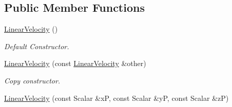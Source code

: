 \subsection*{Public Member Functions}
\begin{DoxyCompactItemize}
\item 
\hyperlink{classow__core_1_1LinearVelocity_af76f6ab631d054f1c09e791197508f7c}{Linear\+Velocity} ()\hypertarget{classow__core_1_1LinearVelocity_af76f6ab631d054f1c09e791197508f7c}{}\label{classow__core_1_1LinearVelocity_af76f6ab631d054f1c09e791197508f7c}

\begin{DoxyCompactList}\small\item\em Default Constructor. \end{DoxyCompactList}\item 
\hyperlink{classow__core_1_1LinearVelocity_a9725a198d5495771376e464f17beeb60}{Linear\+Velocity} (const \hyperlink{classow__core_1_1LinearVelocity}{Linear\+Velocity} \&other)\hypertarget{classow__core_1_1LinearVelocity_a9725a198d5495771376e464f17beeb60}{}\label{classow__core_1_1LinearVelocity_a9725a198d5495771376e464f17beeb60}

\begin{DoxyCompactList}\small\item\em Copy constructor. \end{DoxyCompactList}\item 
\hyperlink{classow__core_1_1LinearVelocity_abd23302bfd260cbbbfcd12f71129a5c0}{Linear\+Velocity} (const Scalar \&xP, const Scalar \&yP, const Scalar \&zP)\hypertarget{classow__core_1_1LinearVelocity_abd23302bfd260cbbbfcd12f71129a5c0}{}\label{classow__core_1_1LinearVelocity_abd23302bfd260cbbbfcd12f71129a5c0}


\end{DoxyCompactItemize}

